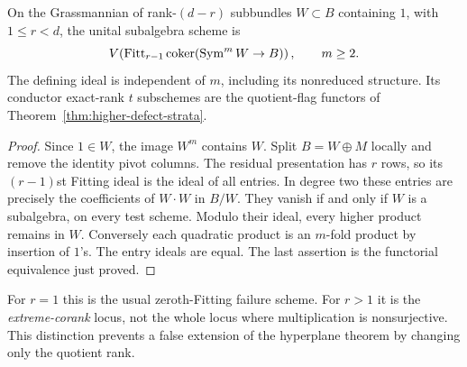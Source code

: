 \begin{proposition}
\label{prop:extreme-corank}
On the Grassmannian of rank-$(d-r)$ subbundles $W\subset B$ containing
$1$, with $1\le r<d$, the unital subalgebra scheme is
\[
 V\!\left(\operatorname{Fitt}_{r-1}
       \operatorname{coker}(\operatorname{Sym}^m W\to B)\right),\qquad m\ge2.
\]
The defining ideal is independent of $m$, including its nonreduced
structure. Its conductor exact-rank $t$ subschemes are the quotient-flag
functors of Theorem~\ref{thm:higher-defect-strata}.
\end{proposition}
\begin{proof}
Since $1\in W$, the image $W^m$ contains $W$. Split $B=W\oplus M$
locally and remove the identity pivot columns. The residual
presentation has $r$ rows, so its $(r-1)$st Fitting ideal is the ideal
of all entries. In degree two these entries are precisely the
coefficients of $W\cdot W$ in $B/W$. They vanish if and only if $W$
is a subalgebra, on every test scheme. Modulo their ideal, every
higher product remains in $W$. Conversely each quadratic product is
an $m$-fold product by insertion of $1$'s. The entry ideals are equal.
The last assertion is the functorial equivalence just proved.
\end{proof}

For $r=1$ this is the usual zeroth-Fitting failure scheme. For $r>1$
it is the \emph{extreme-corank} locus, not the whole locus where
multiplication is nonsurjective. This distinction prevents a false
extension of the hyperplane theorem by changing only the quotient rank.

